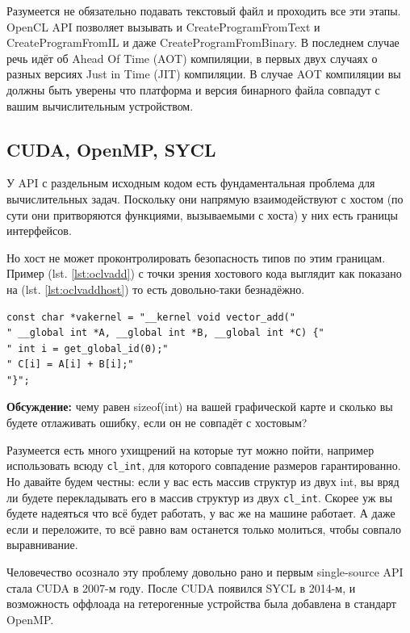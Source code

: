 \documentclass[a4paper,12pt,oneside]{article}
\begin{document}
Разумеется не обязательно подавать текстовый файл и проходить все эти этапы.
OpenCL API позволяет вызывать и CreateProgramFromText и CreateProgramFromIL и даже CreateProgramFromBinary.
В последнем случае речь идёт об Ahead Of Time (AOT) компиляции, в первых двух случаях о разных версиях Just in Time (JIT) компиляции.
В случае AOT компиляции вы должны быть уверены что платформа и версия бинарного файла совпадут с вашим вычислительным устройством.

\subsection{CUDA, OpenMP, SYCL}\label{subsec:typesafety}

У API с раздельным исходным кодом есть фундаментальная проблема для вычислительных задач.
Поскольку они напрямую взаимодействуют с хостом (по сути они притворяются функциями, вызываемыми с хоста) у них есть границы интерфейсов.

Но хост не может проконтролировать безопасность типов по этим границам. Пример (lst. \ref{lst:oclvadd}) с точки зрения хостового кода выглядит как показано на (lst. \ref{lst:oclvaddhost}) то есть довольно-таки безнадёжно.

\begin{lstlisting}[caption={Векторное сложение, OpenCL c точки зрения хоста},label={lst:oclvaddhost}]
const char *vakernel = "__kernel void vector_add("
" __global int *A, __global int *B, __global int *C) {"
" int i = get_global_id(0);"
" C[i] = A[i] + B[i];"
"}";
\end{lstlisting}

\textbf{Обсуждение:} чему равен sizeof(int) на вашей графической карте и сколько вы будете отлаживать ошибку, если он не совпадёт с хостовым?

Разумеется есть много ухищрений на которые тут можно пойти, например использовать всюду \lstinline!cl_int!, для которого совпадение размеров гарантированно.
Но давайте будем честны: если у вас есть массив структур из двух int, вы вряд ли будете перекладывать его в массив структур из двух \lstinline!cl_int!.
Скорее уж вы будете надеяться что всё будет работать, у вас же на машине работает.
А даже если и переложите, то всё равно вам останется только молиться, чтобы совпало выравнивание.

Человечество осознало эту проблему довольно рано и первым single-source API стала CUDA в 2007-м году. После CUDA появился SYCL в 2014-м, и возможность оффлоада на гетерогенные устройства была добавлена в стандарт OpenMP.
\end{document}

